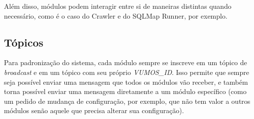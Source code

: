     Além disso, módulos podem interagir entre si de maneiras distintas quando necessário, como é o caso do Crawler e do SQLMap Runner, por exemplo.
    
    \subsection{Tópicos}
    
    Para padronização do sistema, cada módulo sempre se inscreve em um tópico de \textit{broadcast} e em um tópico com seu próprio \textit{VUMOS\_ID}. Isso permite que sempre seja possível enviar uma mensagem que todos os módulos vão receber, e também torna possível enviar uma mensagem diretamente a um módulo específico (como um pedido de mudança de configuração, por exemplo, que não tem valor a outros módulos senão aquele que precisa alterar sua configuração).
    

    







% 